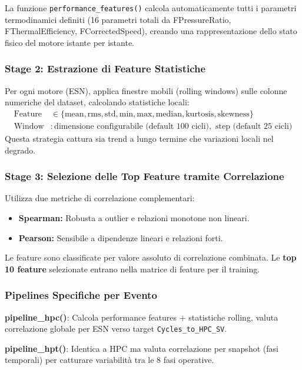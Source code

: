La funzione \texttt{performance\_features()} calcola automaticamente tutti i parametri termodinamici definiti (16 parametri totali da FPressureRatio, FThermalEfficiency, FCorrectedSpeed), creando una rappresentazione dello stato fisico del motore istante per istante.

\subsubsection{Stage 2: Estrazione di Feature Statistiche}

Per ogni motore (ESN), applica finestre mobili (rolling windows) sulle colonne numeriche del dataset, calcolando statistiche locali:
\begin{align}
\text{Feature} &\in \{\text{mean}, \text{rms}, \text{std}, \text{min}, \text{max}, \text{median}, \text{kurtosis}, \text{skewness}\} \\
\text{Window} &: \text{dimensione configurabile (default 100 cicli)}, \text{ step (default 25 cicli)}
\end{align}
Questa strategia cattura sia trend a lungo termine che variazioni locali nel degrado.

\subsubsection{Stage 3: Selezione delle Top Feature tramite Correlazione}

Utilizza due metriche di correlazione complementari:
\begin{itemize}
    \item \textbf{Spearman:} Robusta a outlier e relazioni monotone non lineari.
    \item \textbf{Pearson:} Sensibile a dipendenze lineari e relazioni forti.
\end{itemize}
Le feature sono classificate per valore assoluto di correlazione combinata. Le \textbf{top 10 feature} selezionate entrano nella matrice di feature per il training.

\subsubsection{Pipelines Specifiche per Evento}

\textbf{pipeline\_hpc()}: Calcola performance features + statistiche rolling, valuta correlazione globale per ESN verso target \texttt{Cycles\_to\_HPC\_SV}.

\textbf{pipeline\_hpt()}: Identica a HPC ma valuta correlazione per snapshot (fasi temporali) per catturare variabilità tra le 8 fasi operative.

